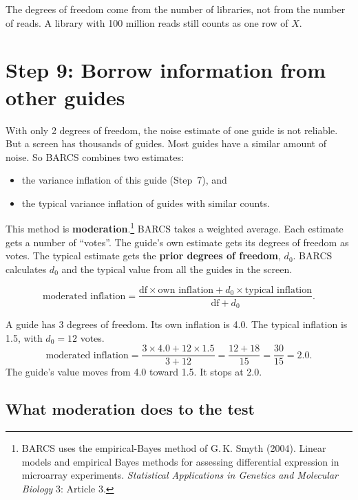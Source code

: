 \begin{remember}
The degrees of freedom come from the number of libraries, not from the
number of reads. A library with 100 million reads still counts as one row
of $X$.
\end{remember}

\section{Step 9: Borrow information from other guides}

With only 2 degrees of freedom, the noise estimate of one guide is not
reliable. But a screen has thousands of guides. Most guides have a similar
amount of noise. So BARCS combines two estimates:

\begin{itemize}
\item the variance inflation of this guide (Step~7), and
\item the typical variance inflation of guides with similar counts.
\end{itemize}

This method is \textbf{moderation}.\footnote{BARCS uses the
empirical-Bayes method of G.\,K. Smyth (2004). Linear models and empirical
Bayes methods for assessing differential expression in microarray
experiments. \emph{Statistical Applications in Genetics and Molecular
Biology} 3: Article 3.} BARCS takes a weighted average. Each
estimate gets a number of ``votes''. The guide's own estimate gets its
degrees of freedom as votes. The typical estimate gets the \textbf{prior
degrees of freedom}, $d_0$. BARCS calculates $d_0$ and the typical value
from all the guides in the screen.

\[
\text{moderated inflation} =
\frac{\text{df} \times \text{own inflation} + d_0 \times
\text{typical inflation}}{\text{df} + d_0}.
\]

\begin{worked}
A guide has 3 degrees of freedom. Its own inflation is 4.0. The typical
inflation is 1.5, with $d_0 = 12$ votes.
\[
\text{moderated inflation} = \frac{3 \times 4.0 + 12 \times 1.5}{3 + 12}
 = \frac{12 + 18}{15} = \frac{30}{15} = 2.0.
\]
The guide's value moves from 4.0 toward 1.5. It stops at 2.0.
\end{worked}

\subsection{What moderation does to the test}

